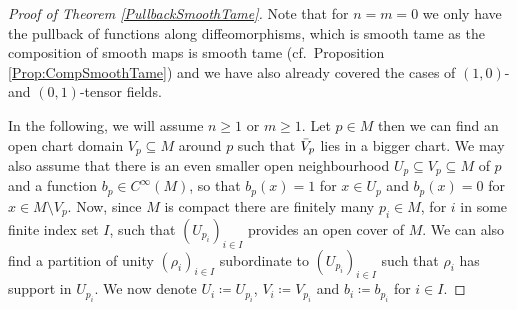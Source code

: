 \documentclass[12pt,a4paper]{article}
\theoremstyle{plain}
\theoremstyle{definition}
\begin{document}
\begin{proof}[Proof of Theorem \ref{PullbackSmoothTame}]
Note that for $n=m=0$ we only have the pullback of functions along diffeomorphisms, which is smooth tame as the composition of smooth maps is smooth tame (cf.~Proposition \ref{Prop:CompSmoothTame}) and we have also already covered the cases of $(1,0)$- and $(0,1)$-tensor fields.

In the following, we will assume $n\geq 1$ or $m\geq 1$. 
Let $p\in M$ then we can find an open chart domain $V_p\subseteq M$ around $p$ such that $\Bar{V}_p$ lies in a bigger chart.
We may also assume that there is an even smaller open neighbourhood $U_p\subseteq V_p\subseteq M$ of $p$ and a function $b_p\in C^\infty(M)$, so that $b_p(x)=1$ for $x\in U_p$ and $b_p(x)=0$ for $x\in M\setminus V_p$. Now, since $M$ is compact there are finitely many $p_i\in M$, for $i$ in some finite index set $I$, such that $(U_{p_i})_{i\in I}$ provides an open cover of $M$. We can also find a partition of unity $(\rho_i)_{i\in I}$ subordinate to $(U_{p_i})_{i\in I}$ such that $\rho_i$ has support in $U_{p_i}$. We now denote $U_i\coloneqq U_{p_i}$, $V_i\coloneqq V_{p_i}$ and $b_i\coloneqq b_{p_i}$ for $i\in I$.   
 


\end{proof}
\end{document}
